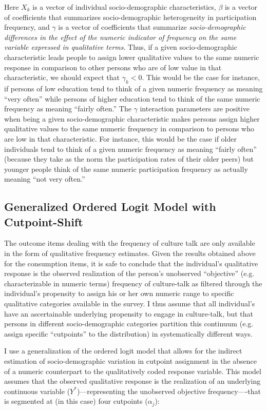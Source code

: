 \documentclass[11pt]{article}
\begin{document}
Here $X_k$ is a vector of individual socio-demographic characteristics, $\beta$ is a vector of coefficients that summarizes socio-demographic heterogeneity in participation frequency, and $\gamma$ is a vector of coefficients that summarize \emph{socio-demographic differences in the effect of the numeric indicator of frequency on the same variable expressed in qualitative terms}. Thus, if a given socio-demographic characteristic leads people to assign lower qualitative values to the same numeric response in comparison to other persons who are of low value in that characteristic, we should expect that $\gamma_k<0$. This would be the case for instance, if persons of low education tend to think of a given numeric frequency as meaning ``very often'' while persons of higher education tend to think of the same numeric frequency as meaning ``fairly often.'' The $\gamma$ interaction parameters are positive when being a given socio-demographic characteristic makes persons assign higher qualitative values to the same numeric frequency in comparison to persons who are low in that characteristic.  For instance, this would be the case if older individuals tend to think of a given numeric frequency as meaning ``fairly often'' (because they take as the norm the participation rates of their older peers) but younger people think of the same numeric participation frequency as actually meaning ``not very often.'' 

\subsection{Generalized Ordered Logit Model with Cutpoint-Shift}
The outcome items dealing with the frequency of culture talk are only available in the form of qualitative frequency estimates.  Given the results obtained above for the consumption items, it is safe to conclude that the individual's qualitative response is the observed realization of the person's unobserved ``objective'' (e.g. characterizable in numeric terms) frequency of culture-talk as filtered through the individual's propensity to assign his or her own numeric range to specific qualitative categories available in the survey.  I thus assume that all individual's have an ascertainable underlying propensity to engage in culture-talk, but that persons in different socio-demographic categories partition this continuum (e.g. assign specific ``cutpoints'' to the distribution) in systematically different ways.  

I use a generalization of the ordered logit model that allows for the indirect estimation of socio-demographic variation in cutpoint assignment in the absence of a numeric counterpart to the qualitatively coded response variable.  This model assumes that the observed qualitative response is the realization of an underlying continuous variable ($Y^*$)---representing the unobserved objective frequency----that is segmented at (in this case) four cutpoints ($\alpha_j$):
\end{document}
